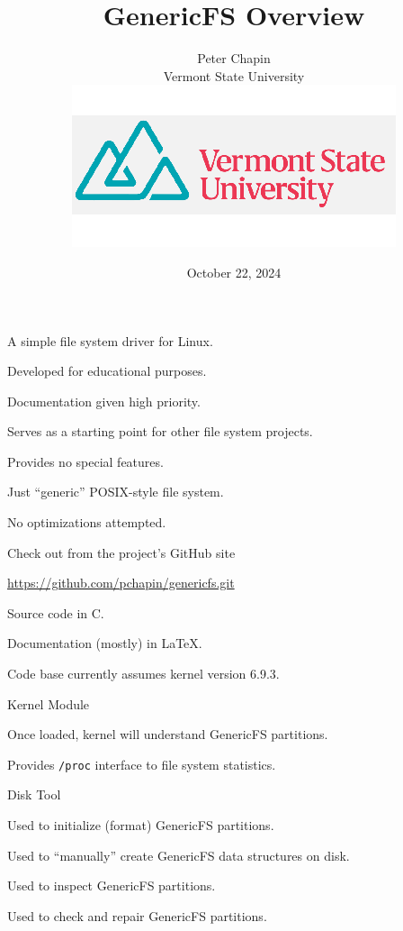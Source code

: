 \documentclass[landscape]{slides}
\title{\color{titlecolor}GenericFS Overview}
\author{
  \begin{tabular}{c}
  \\[3mm]
  \Large{Peter Chapin} \\[2mm]
  \normalsize{Vermont State University}\\[5mm]
  \includegraphics[scale=0.80]{VTSU.png}\\[16mm]
  \end{tabular}
}
\date{October 22, 2024}
\begin{document}
\color{Black}
\pagecolor{Background}

\maketitle


\begin{citemize}
  \item A simple file system driver for Linux.
    \begin{citemize}
    \item Developed for educational purposes.
    \item Documentation given high priority.
    \item Serves as a starting point for other file system projects.
    \end{citemize}
  \item Provides no special features.
    \begin{citemize}
    \item Just ``generic'' POSIX-style file system.
    \item No optimizations attempted.
    \end{citemize}
\end{citemize}
\stopslide


Check out from the project's GitHub site

\vspace{5mm}
\centerline{\url{https://github.com/pchapin/genericfs.git}}

\begin{citemize}
\item Source code in C.
\item Documentation (mostly) in \LaTeX.
\item Code base currently assumes kernel version 6.9.3.
\end{citemize}
\stopslide


\begin{citemize}
\item Kernel Module
\begin{citemize}
\item Once loaded, kernel will understand GenericFS partitions.
\item Provides \texttt{/proc} interface to file system statistics.
\end{citemize}

\item Disk Tool
\begin{citemize}
\item Used to initialize (format) GenericFS partitions.
\item Used to ``manually'' create GenericFS data structures on disk.
\item Used to inspect GenericFS partitions.
\item Used to check and repair GenericFS partitions.
\end{citemize}
\end{citemize}
\stopslide
\end{document}
